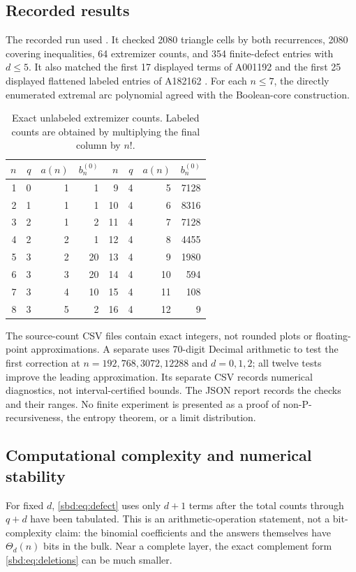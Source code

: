 \documentclass[11pt,a4paper]{article}
\theoremstyle{definition}
\newcommand{\code}[1]{\texttt{\detokenize{#1}}}
\begin{document}
\subsection{Recorded results}
The recorded run used \code{--max-n 64 --brute-n 7}. It checked
2080 triangle cells by both recurrences, 2080 covering inequalities,
64 extremizer counts, and 354 finite-defect entries with $d\le5$.
It also matched the first 17 displayed terms of A001192 and the first
25 displayed flattened labeled entries of A182162
\cite{oeis1192,oeis162}.
For each $n\le7$, the directly enumerated extremal arc polynomial
agreed with the Boolean-core construction.

\begin{table}[htbp]
\centering
\caption{Exact unlabeled extremizer counts. Labeled counts are obtained
by multiplying the final column by $n!$.}
\begin{tabular}{r r r r@{\qquad}r r r r}
\toprule
$n$&$q$&$a(n)$&$b_n^{(0)}$&$n$&$q$&$a(n)$&$b_n^{(0)}$\\
\midrule
1&0&1&1&9&4&5&7128\\
2&1&1&1&10&4&6&8316\\
3&2&1&2&11&4&7&7128\\
4&2&2&1&12&4&8&4455\\
5&3&2&20&13&4&9&1980\\
6&3&3&20&14&4&10&594\\
7&3&4&10&15&4&11&108\\
8&3&5&2&16&4&12&9\\
\bottomrule
\end{tabular}
\end{table}

The source-count CSV files contain exact integers, not rounded plots or
floating-point approximations. A separate \code{check_asymptotics.py}
uses 70-digit Decimal arithmetic to test the first correction at
$n=192,768,3072,12288$ and $d=0,1,2$; all twelve tests improve the
leading approximation. Its separate CSV records numerical diagnostics,
not interval-certified bounds. The JSON report records the checks and
their ranges. No finite experiment is presented as a proof of
non-P-recursiveness, the entropy theorem, or a limit distribution.

\subsection{Computational complexity and numerical stability}
For fixed $d$, \eqref{sbd:eq:defect} uses only $d+1$ terms after the total
counts through $q+d$ have been tabulated. This is an arithmetic-operation
statement, not a bit-complexity claim: the binomial coefficients and the
answers themselves have $\Theta_d(n)$ bits in the bulk. Near a complete
layer, the exact complement form \eqref{sbd:eq:deletions} can be much smaller.
\end{document}
